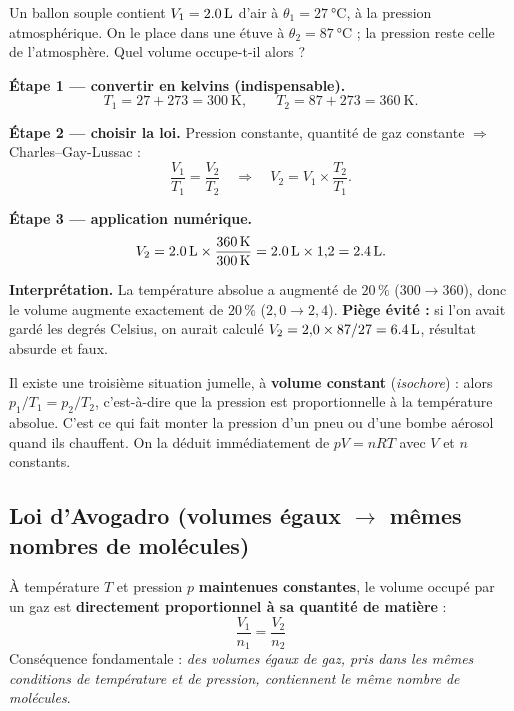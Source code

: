 \documentclass[11pt,a4paper]{article}
\begin{document}
\begin{exemple}
Un ballon souple contient $V_1=\qty{2{,}0}{\litre}$ d'air à $\theta_1=\qty{27}{\degreeCelsius}$, à la
pression atmosphérique. On le place dans une étuve à $\theta_2=\qty{87}{\degreeCelsius}$ ; la pression
reste celle de l'atmosphère. Quel volume occupe-t-il alors ?

\smallskip
\textbf{Étape 1 — convertir en kelvins (indispensable).}
\[ T_1 = 27+273 = \qty{300}{\kelvin}, \qquad T_2 = 87+273 = \qty{360}{\kelvin}. \]

\textbf{Étape 2 — choisir la loi.} Pression constante, quantité de gaz constante $\Rightarrow$
Charles--Gay-Lussac :
\[ \frac{V_1}{T_1}=\frac{V_2}{T_2}
   \quad\Longrightarrow\quad
   V_2 = V_1\times\frac{T_2}{T_1}. \]

\textbf{Étape 3 — application numérique.}
\[ V_2 = \qty{2{,}0}{\litre}\times\frac{\qty{360}{\kelvin}}{\qty{300}{\kelvin}}
       = \qty{2{,}0}{\litre}\times1{,}2 = \qty{2{,}4}{\litre}. \]

\textbf{Interprétation.} La température absolue a augmenté de $20\,\%$ ($300\to360$), donc le volume
augmente exactement de $20\,\%$ ($2{,}0\to2{,}4$). \textbf{Piège évité :} si l'on avait gardé les
degrés Celsius, on aurait calculé $V_2=2{,}0\times87/27=\qty{6{,}4}{\litre}$, résultat absurde et faux.
\end{exemple}

\begin{remarque}
Il existe une troisième situation jumelle, à \textbf{volume constant} (\emph{isochore}) : alors
$p_1/T_1=p_2/T_2$, c'est-à-dire que la pression est proportionnelle à la température absolue. C'est ce
qui fait monter la pression d'un pneu ou d'une bombe aérosol quand ils chauffent. On la déduit
immédiatement de $pV=nRT$ avec $V$ et $n$ constants.
\end{remarque}

\subsection{Loi d'Avogadro (volumes égaux \texorpdfstring{$\to$}{->} mêmes nombres de molécules)}

\begin{theoreme}
À température $T$ et pression $p$ \textbf{maintenues constantes}, le volume occupé par un gaz est
\textbf{directement proportionnel à sa quantité de matière} :
\[ \boxed{\,\frac{V_1}{n_1}=\frac{V_2}{n_2}\,} \]
Conséquence fondamentale : \emph{des volumes égaux de gaz, pris dans les mêmes conditions de
température et de pression, contiennent le même nombre de molécules}.
\end{theoreme}
\end{document}
